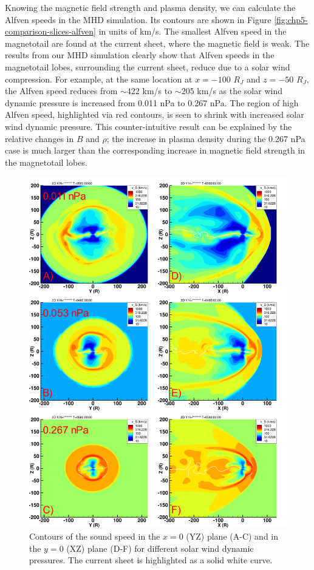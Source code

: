 Knowing the magnetic field strength and plasma density, we can calculate the Alfven speeds in the MHD simulation. Its contours are shown in Figure \ref{fig:chp5-comparison-slices-alfven} in units of km/s. The smallest Alfven speed in the magnetotail are found at the current sheet, where the magnetic field is weak. The results from our MHD simulation clearly show that Alfven speeds in the magnetotail lobes, surrounding the current sheet, reduce due to a solar wind compression. For example, at the same location at $x=-100$ $R_J$ and $z=-50$ $R_J$, the Alfven speed reduces from $\sim422$ km/s to $\sim205$ km/s as the solar wind dynamic pressure is increased from 0.011 nPa to 0.267 nPa. The region of high Alfven speed, highlighted via red contours, is seen to shrink with increased solar wind dynamic pressure. This counter-intuitive result can be explained by the relative changes in $B$ and $\rho$; the increase in plasma density during the 0.267 nPa case is much larger than the corresponding increase in magnetic field strength in the magnetotail lobes. 

\begin{figure}
    \centering
    \includegraphics[height=0.9\textheight]{images5/compare_runs_currentsheet_SoundSpeed.png}
    \caption{Contours of the sound speed in the $x=0$ (YZ) plane (A-C) and in the $y=0$ (XZ) plane (D-F) for different solar wind dynamic pressures. The current sheet is highlighted as a solid white curve.}
    \label{fig:chp5-comparison-slices-sound}
\end{figure}

